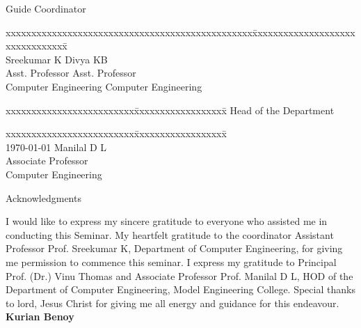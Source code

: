 \documentclass[12pt]{report}
\begin{document}
\begin{titlepage}
\begin{tabbing}
Guide \> Coordinator
\end{tabbing}
\begin{tabbing}
xxxxxxxxxxxxxxxxxxxxxxxxxxxxxxxxxxxxxxxxxxxxxxxx\=
xxxxxxxxxxxxxxxxxxxxxxxxxxxxxxxx\= \kill
\vspace{.1in}\\
Sreekumar K  \>Divya KB\\
Asst. Professor    \>Asst. Professor\\
Computer Engineering    \>    Computer Engineering
\end{tabbing}
\vspace{.08in}
%
\begin{tabbing}
xxxxxxxxxxxxxxxxxxxxxxxxx\= xxxxxxxxxxxxxxxxxx\= \kill
\>Head of the Department
\end{tabbing}
\begin{tabbing}
xxxxxxxxxxxxxxxxxxxxxxxxx\= xxxxxxxxxxxxxxxxxx\= \kill
\vspace{.1in}\\
\today
\>Manilal D L\\
\>Associate Professor\\
\>Computer Engineering\\
\end{tabbing}
\end{titlepage}



\begin{titlepage}

\vspace{.25in}
\begin{center}
\Large{Acknowledgments}\\
\end{center}
\normalsize
\vspace{.25in}
 I would like to express my sincere gratitude to everyone who assisted
me in conducting
 this Seminar. My heartfelt gratitude to the coordinator Assistant
Professor Prof.
 Sreekumar K, Department of Computer Engineering, for giving me
permission to commence
 this seminar. I express my gratitude to Principal Prof. (Dr.) Vinu Thomas and
 Associate Professor Prof. Manilal D L, HOD of the Department of
Computer Engineering,
 Model Engineering College. Special thanks to lord, Jesus Christ for
giving me all
 energy and guidance for this endeavour.
\vspace{.25in}
\flushleft\textbf{Kurian Benoy}
\end{titlepage}
\end{document}

